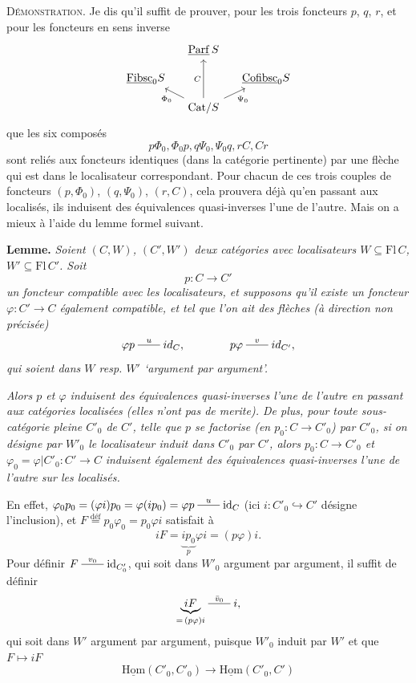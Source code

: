 \documentclass[11pt]{article}
\newcommand{\printedpage}[1]{\marginpar{\footnotesize p.~#1}}
\newcommand{\msp}[1]{\marginpar{\footnotesize [#1]}}
\newcommand{\ul}[1]{\underline{\mathrm{#1}}}
\newcommand{\xline}[1]{\mathrel{\overset{#1}{\rule[0.6ex]{2em}{0.4pt}}}}
\begin{document}
\msp{page 11}
\textsc{Démonstration}. Je dis qu'il suffit de prouver, pour les trois foncteurs $p$, $q$, $r$, et pour les foncteurs en sens inverse
\printedpage{8}
\[
\begin{tikzcd}[column sep=small, row sep=small]
 & \ul{Parf}\,S & \\
\ul{Fibsc}_0S & & \ul{Cofibsc}_0S \\
 & \mathrm{Cat}/S \arrow[uu, "C"] \arrow[ul, "\Phi_0"] \arrow[ur, "\Psi_0"'] &
\end{tikzcd}
\]
que les six composés
\[
p\Phi_0, \Phi_0p, q\Psi_0, \Psi_0q, rC, Cr
\]
sont reliés aux foncteurs identiques (dans la catégorie pertinente) par une flèche qui est dans le localisateur correspondant. Pour chacun de ces trois couples de foncteurs $(p,\Phi_0)$, $(q,\Psi_0)$, $(r,C)$, cela prouvera déjà qu'en passant aux localisés, ils induisent des équivalences quasi-inverses l'une de l'autre. Mais on a mieux à l'aide du lemme formel suivant.

\textbf{Lemme.} \textit{Soient $(C,W)$, $(C',W')$ deux catégories avec localisateurs $W \subseteq \mathrm{Fl}\,C$, $W' \subseteq \mathrm{Fl}\,C'$. Soit}
\[
p : C \longrightarrow C'
\]
\textit{un foncteur compatible avec les localisateurs, et supposons qu'il existe un foncteur $\varphi : C' \longrightarrow C$ également compatible, et tel que l'on ait des flèches (à direction non précisée)}
\[
\varphi p \xline{u} id_C, \qquad\qquad p\varphi \xline{v} id_{C'},
\]
\textit{qui soient dans $W$ resp. $W'$ `argument par argument'.}

\msp{page 12}
\textit{Alors $p$ et $\varphi$ induisent des équivalences quasi-inverses l'une de l'autre en passant aux catégories localisées (elles n'ont pas de merite). De plus, pour toute sous-catégorie pleine $C'_0$ de $C'$, telle que $p$ se factorise (en $p_0 : C \longrightarrow C'_0$) par $C'_0$, si on désigne par $W'_0$ le localisateur induit dans $C'_0$ par $C'$, alors $p_0 : C \longrightarrow C'_0$ et $\varphi_0 = \varphi|C'_0 : C' \longrightarrow C$} \textit{induisent également des équivalences quasi-inverses l'une de l'autre sur les localisés.} %

En effet, $\varphi_0p_0 = (\varphi i)p_0 = \varphi(ip_0) = \varphi p \xline{u} \mathrm{id}_C$ (ici $i : C'_0 \hookrightarrow C'$ désigne l'inclusion), et $F \overset{\text{déf}}{=} p_0\varphi_0 = p_0\varphi i$ satisfait à
\[
iF = \underbrace{ip_0}_{p}\varphi i = (p\varphi)i.
\]
Pour définir $F \xline{v_0} \mathrm{id}_{C'_0}$, qui soit dans $W'_0$ argument par argument,
\msp{page 13}
il suffit de définir
\[
\underbrace{iF}_{=\,(p\varphi)i} \xline{\bar v_0} i,
\]
qui soit dans $W'$ argument par argument, puisque $W'_0$ induit par $W'$ et que $F \longmapsto iF$
\[
\ul{Hom}(C'_0,C'_0) \longrightarrow \ul{Hom}(C'_0,C')
\]
\end{document}
